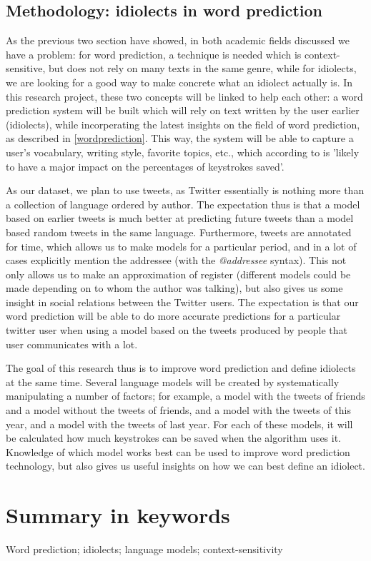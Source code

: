 \documentclass[12pt]{article}
\begin{document}
\subsection{Methodology: idiolects in word prediction} \label{link}
As the previous two section have showed, in both academic fields discussed we have a problem: for word prediction, a technique is needed which is context-sensitive, but does not rely on many texts in the same genre, while for idiolects, we are looking for a good way to make concrete what an idiolect actually is. In this research project, these two concepts will be linked to help each other: a word prediction system will be built which will rely on text written by the user earlier (idiolects), while incorperating the latest insights on the field of word prediction, as described in \ref{wordprediction}. This way, the system will be able to capture a user's vocabulary, writing style, favorite topics, etc., which according to  is 'likely to have a major impact on the percentages of keystrokes saved'.

As our dataset, we plan to use tweets, as Twitter essentially is nothing more than a collection of language ordered by author. The expectation thus is that a model based on earlier tweets is much better at predicting future tweets than a model based random tweets in the same language. Furthermore, tweets are annotated for time, which allows us to make models for a particular period, and in a lot of cases explicitly mention the addressee (with the \emph{@addressee} syntax). This not only allows us to make an approximation of register (different models could be made depending on to whom the author was talking), but also gives us some insight in social relations between the Twitter users. The expectation is that our word prediction will be able to do more accurate predictions for a particular twitter user when using a model based on the tweets produced by people that user communicates with a lot.

The goal of this research thus is to improve word prediction and define idiolects at the same time. Several language models will be created by systematically manipulating a number of factors; for example, a model with the tweets of friends and a model without the tweets of friends, and a model with the tweets of this year, and a model with the tweets of last year. For each of these models, it will be calculated how much keystrokes can be saved when the algorithm uses it. Knowledge of which model works best can be used to improve word prediction technology, but also gives us useful insights on how we can best define an idiolect.

\section{Summary in keywords}
Word prediction; idiolects; language models; context-sensitivity

{}

\end{document}
